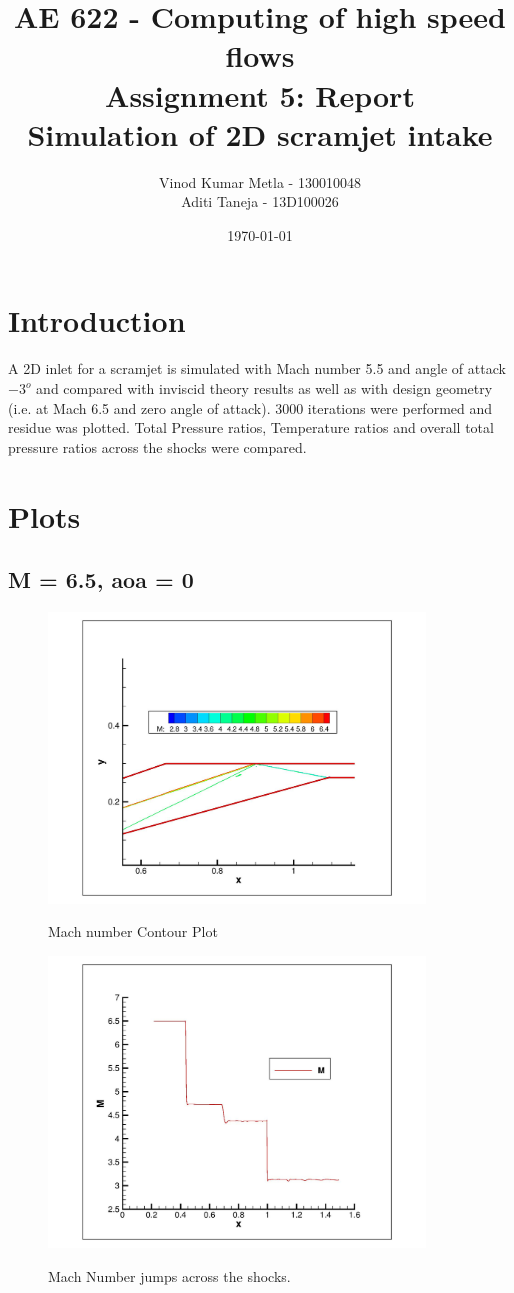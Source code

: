 \documentclass{article}
\title{AE 622 - Computing of high speed flows\\ Assignment 5: Report \\ Simulation of 2D scramjet intake}
\author{Vinod Kumar Metla - 130010048\\Aditi Taneja - 13D100026}
\date{\today}
\begin{document}
\maketitle
\newpage

\section*{Introduction}
A 2D inlet for a scramjet is simulated with Mach number 5.5 and angle of attack $-3^o$ and compared with inviscid theory results as well as with design geometry (i.e. at Mach 6.5 and zero angle of attack). 3000 iterations were performed and residue was plotted.
Total Pressure ratios, Temperature ratios and overall total pressure ratios across the shocks were compared.

\section*{Plots}
\subsection*{M = 6.5, aoa = 0}
\begin{figure}[H]   \label{figure}
\includegraphics[width=10cm]{6.5/M_cont_1.jpg}		%
\label{figure:}
\caption{Mach number Contour Plot}
\end{figure}

\begin{figure}[H]   \label{figure}
\includegraphics[width=10cm]{6.5/Mach_1.jpg}		%
\label{figure:}
\caption{Mach Number jumps across the shocks.}
\end{figure}
\end{document}
